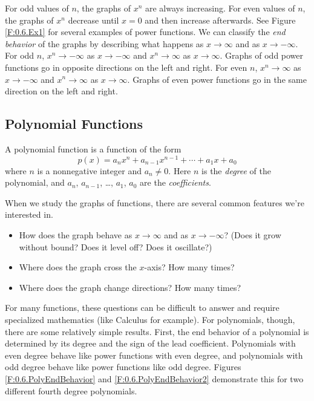 For odd values of $n$, the graphs of $x^{n}$ are always increasing.  For even values of
$n$, the graphs of $x^{n}$ decrease until $x=0$ and then increase afterwards. See Figure
\ref{F:0.6.Ex1} for several examples of power functions. We can classify the {\it end
behavior} of the graphs by describing what happens as $x\to\infty$ and as $x\to-\infty$.
For odd $n$, $x^{n}\to -\infty$ as $x\to-\infty$ and $x^{n}\to\infty$ as $x\to\infty$.
Graphs of odd power functions go in opposite directions on the left and right.  For even
$n$, $x^{n}\to \infty$ as $x\to-\infty$ and $x^{n}\to\infty$ as $x\to\infty$.  Graphs of
even power functions go in the same direction on the left and right.



\subsection*{Polynomial Functions} 

\begin{definition}
A polynomial function is a function of the form
	\[
		p(x)=a_{n}x^{n} + a_{n-1}x^{n-1}+\cdots + a_{1}x + a_{0}
	\]
where $n$ is a nonnegative integer and $a_{n}\ne 0$.  Here $n$ is the {\it degree} of the
polynomial, and $a_{n}$, $a_{n-1}$, \ldots, $a_{1}$, $a_{0}$ are the {\it coefficients}.
\end{definition}

When we study the graphs of functions, there are several common features we're interested in.  
\begin{itemize}
	\item How does the graph behave as $x\to\infty$ and as $x\to-\infty$? (Does it grow without bound? Does it level off? Does it oscillate?) 
	\item Where does the graph cross the $x$-axis? How many times? 
	\item Where does the graph change directions? How many times?
\end{itemize}

For many functions, these questions can be difficult to answer and require specialized
mathematics (like Calculus for example).  For polynomials, though, there are some
relatively simple results.  First, the end behavior of a polynomial is determined by its
degree and the sign of the lead coefficient.  Polynomials with even degree behave like
power functions with even degree, and polynomials with odd degree behave like power
functions like odd degree. Figures \ref{F:0.6.PolyEndBehavior} and
\ref{F:0.6.PolyEndBehavior2} demonstrate this for two different fourth degree polynomials.

